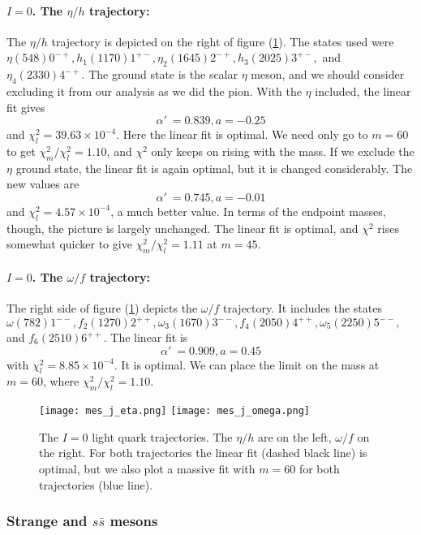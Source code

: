 \documentclass[11pt,a4]{article}
\newcommand{\alp}{\ensuremath{\alpha'\:}}
\newcommand{\ssb}{s\bar{s}}
\newcommand{\rchi}[1]{\ensuremath{\chi^2_m/\chi^2_l = #1}}
\newcommand{\ten}[1]{\times10^{#1}}
\begin{document}
				\paragraph{\(I = 0\). The \(\eta/h\) trajectory:} The \(\eta/h\) trajectory is depicted on the right of figure (\ref{fig:eta_omega}). The states used were \(\eta(548) 0^{-+}, h_1(1170)1^{+-}, \eta_2(1645)2^{-+}, h_3(2025)3^{+-},\) and \(\eta_4(2330)4^{-+}\). The ground state is the scalar \(\eta\) meson, and we should consider excluding it from our analysis as we did the pion. With the \(\eta\) included, the linear fit gives
				\[ \alp = 0.839, a = -0.25 \]
				and \(\chi^2_l = 39.63\ten{-4}\). Here the linear fit is optimal. We need only go to \(m = 60\) to get \rchi{1.10}, and \(\chi^2\) only keeps on rising with the mass. If we exclude the \(\eta\) ground state, the linear fit is again optimal, but it is changed considerably. The new values are
				\[ \alp = 0.745, a = -0.01 \]
				and \(\chi^2_l = 4.57\ten{-4}\), a much better value. In terms of the endpoint masses, though, the picture is largely unchanged. The linear fit is optimal, and \(\chi^2\) rises somewhat quicker to give \rchi{1.11} at \(m = 45\).
				
				\paragraph{\(I = 0\). The \(\omega/f\) trajectory:} The right side of figure (\ref{fig:eta_omega}) depicts the \(\omega/f\) trajectory. It includes the states \(\omega(782)1^{--}, f_2(1270)2^{++}, \omega_3(1670)3^{--}, f_4(2050)4^{++}, \omega_5(2250)5^{--},\) and \(f_6(2510)6^{++}\). The linear fit is
				\[ \alp = 0.909, a = 0.45 \]
				with \(\chi^2_l = 8.85\ten{-4}\). It is optimal. We can place the limit on the mass at \(m = 60\), where \rchi{1.10}.
				
				\begin{figure}[tbp] \centering
						\texttt{[image: mes\_j\_eta.png]}	 \hfill
						\texttt{[image: mes\_j\_omega.png]}
						\caption{\label{fig:eta_omega} The \(I = 0\) light quark trajectories. The \(\eta/h\) are on the left, \(\omega/f\) on the right. For both trajectories the linear fit (dashed black line) is optimal, but we also plot a massive fit with \(m = 60\) for both trajectories (blue line).}
				\end{figure}
				
			\subsubsection{Strange and \texorpdfstring{$\ssb$}{s-sbar} mesons}
\end{document}

